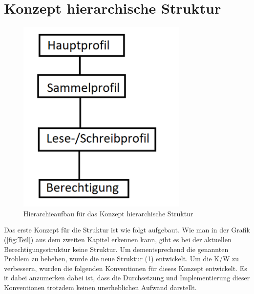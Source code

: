 \section{Konzept hierarchische Struktur}
\label{sec:chapter04:Struktur}
\begin{figure}[h!]
 \centering
 \includegraphics[width=0.75\textwidth]{gfx/Picture/Hierarchie.PNG}
 \caption{Hierarchieaufbau für das Konzept hierarchische Struktur}
 \label{fig:Struktur}
\end{figure}
Das erste Konzept für die Struktur ist wie folgt aufgebaut.
Wie man in der Grafik (\ref{fig:Teil}) aus dem zweiten Kapitel erkennen kann, gibt es bei der aktuellen Berechtigungsstruktur keine Struktur.
Um dementsprechend die genannten Problem zu beheben, wurde die neue Struktur (\ref{fig:Struktur}) entwickelt.
Um die \ac{K/W} zu verbessern, wurden die folgenden Konventionen für dieses Konzept entwickelt.
Es it dabei anzumerken dabei ist, dass die Durchsetzung und Implementierung dieser Konventionen trotzdem keinen unerheblichen Aufwand darstellt.
